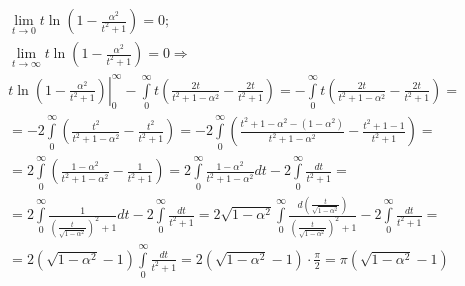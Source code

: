 \documentclass[a4paper, 12pt]{article}
\begin{document}
\begin{enumerate}
\begin{align*}
 &\lim_{t\to0}t\ln\left(1-\frac{\alpha^2}{t^2+1}\right) = 0; \\
 &\lim_{t\to\infty}t\ln\left(1-\frac{\alpha^2}{t^2+1}\right) = 0 \Rightarrow \\
 &\left.t\ln\left(1-\frac{\alpha^2}{t^2+1}\right)\right|_0^\infty - 
 \int\limits_0^\infty t\left(\frac{2t}{t^2+1-\alpha^2} - \frac{2t}{t^2+1}\right) = 
 -\int\limits_0^\infty t\left(\frac{2t}{t^2+1-\alpha^2} - \frac{2t}{t^2+1}\right) = \\
 &=-2\int\limits_0^\infty \left(\frac{t^2}{t^2+1-\alpha^2} - \frac{t^2}{t^2+1}\right) = 
 -2\int\limits_0^\infty \left(
 \frac{t^2+1-\alpha^2 -(1-\alpha^2)}{t^2+1-\alpha^2} - \frac{t^2+1-1}{t^2+1}
 \right) = \\
 &=2\int\limits_0^\infty\left(
 \frac{1-\alpha^2}{t^2+1-\alpha^2} - \frac{1}{t^2+1}
 \right) = 
 2\int\limits_0^\infty\frac{1-\alpha^2}{t^2+1-\alpha^2}dt - 2\int\limits_0^\infty\frac{dt}{t^2+1} = \\
 &=2\int\limits_0^\infty\frac{1}{\left(\frac{t}{\sqrt{1-\alpha^2}}\right)^2+1}dt -
 2\int\limits_0^\infty\frac{dt}{t^2+1} = 
 2\sqrt{1-\alpha^2}\int\limits_0^\infty\frac{d(\frac{t}{\sqrt{1-\alpha^2}})}{\left(\frac{t}{\sqrt{1-\alpha^2}}\right)^2+1} - 2\int\limits_0^\infty\frac{dt}{t^2+1} = \\
 &=2(\sqrt{1-\alpha^2}-1)\int\limits_0^\infty\frac{dt}{t^2+1} = 
 2(\sqrt{1-\alpha^2}-1)\cdot\frac{\pi}{2} = \pi(\sqrt{1-\alpha^2}-1)
\end{align*}

\end{enumerate}


    












 
 
 
 
 
 
 
 
 
 
 
 
 
\end{document}
